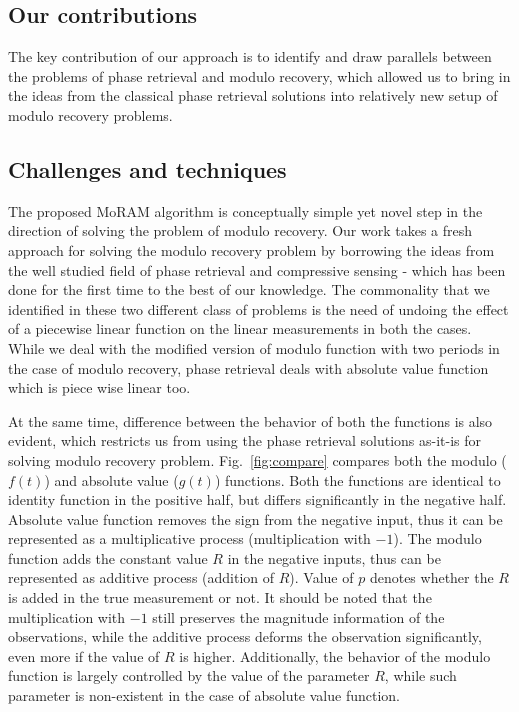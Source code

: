 \subsection{Our contributions}
The key contribution of our approach is to identify and draw parallels between the problems of phase retrieval and modulo recovery, which allowed us to bring in the ideas from the classical phase retrieval solutions into relatively new setup of modulo recovery problems.
\subsection{Challenges and techniques}
The proposed MoRAM algorithm is conceptually simple yet novel step in the direction of solving the problem of modulo recovery. Our work takes a fresh approach for solving the modulo recovery problem by borrowing the ideas from the well studied field of phase retrieval and compressive sensing - which has been done for the first time to the best of our knowledge. The commonality that we identified in these two different class of problems is the need of undoing the effect of a piecewise linear function on the linear measurements in both the cases. While we deal with the modified version of modulo function with two periods in the case of modulo recovery, phase retrieval deals with absolute value function which is piece wise linear too. 

At the same time, difference between the behavior of both the functions is also evident, which restricts us from using the phase retrieval solutions as-it-is for solving modulo recovery problem. Fig.~\ref{fig:compare} compares both the modulo ($f(t)$) and absolute value ($g(t)$) functions. Both the functions are identical to identity function in the positive half, but differs significantly in the negative half. Absolute value function removes the sign from the negative input, thus it can be represented as a multiplicative process (multiplication with $-1$).  The modulo function adds the constant value $R$ in the negative inputs, thus can be represented as additive process (addition of $R$). Value of $p$ denotes whether the $R$ is added in the true measurement or not. It should be noted that the multiplication with $-1$ still preserves the magnitude information of the observations, while the additive process deforms the observation significantly, even more if the value of $R$ is higher. Additionally, the behavior of the modulo function is largely controlled by the value of the parameter $R$, while such parameter is non-existent in the case of absolute value function. 

